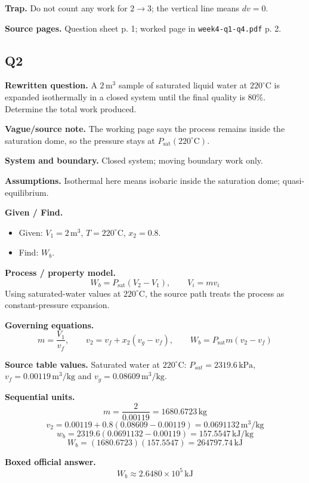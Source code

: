 \textbf{Trap.} Do not count any work for $2\to 3$; the vertical line means $dv=0$.

\textbf{Source pages.} Question sheet p. 1; worked page in \texttt{week4-q1-q4.pdf} p. 2.


\subsection*{Q2}
\textbf{Rewritten question.} A $2\,\text{m}^3$ sample of saturated liquid water at $220^\circ\text{C}$ is expanded isothermally in a closed system until the final quality is 80\%. Determine the total work produced.

\textbf{Vague/source note.} The working page says the process remains inside the saturation dome, so the pressure stays at $P_{\text{sat}}(220^\circ\text{C})$.

\textbf{System and boundary.} Closed system; moving boundary work only.

\textbf{Assumptions.} Isothermal here means isobaric inside the saturation dome; quasi-equilibrium.

\textbf{Given / Find.}
\begin{itemize}
  \item Given: $V_1=2\,\text{m}^3$, $T=220^\circ\text{C}$, $x_2=0.8$.
  \item Find: $W_b$.
\end{itemize}

\textbf{Process / property model.} 
\[
W_b=P_{\text{sat}}(V_2-V_1),\qquad V_i=m v_i
\]
Using saturated-water values at $220^\circ\text{C}$, the source path treats the process as constant-pressure expansion.

\textbf{Governing equations.}
\[
m=\frac{V_1}{v_f},\qquad v_2=v_f+x_2(v_g-v_f),\qquad W_b=P_{\text{sat}}m(v_2-v_f)
\]

\textbf{Source table values.} Saturated water at $220^\circ\text{C}$: $P_{sat}=2319.6\,\text{kPa}$, $v_f=0.00119\,\text{m}^3/\text{kg}$ and $v_g=0.08609\,\text{m}^3/\text{kg}$.

\textbf{Sequential units.}
\[
 m=\frac{2}{0.00119}=1680.6723\,\text{kg}
\]
\[
 v_2=0.00119+0.8(0.08609-0.00119)=0.0691132\,\text{m}^3/\text{kg}
\]
\[
 w_b=2319.6(0.0691132-0.00119)=157.5547\,\text{kJ/kg}
\]
\[
 W_b=(1680.6723)(157.5547)=264797.74\,\text{kJ}
\]

\textbf{Boxed official answer.}
\[
\boxed{W_b\approx2.6480\times10^5\,\text{kJ}}
\]

